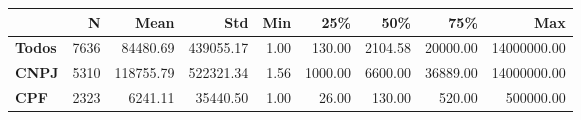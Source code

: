 \begin{tabular}{lrrrrrrrr}
\toprule
{} &    N &      Mean &       Std &  Min &     25\% &     50\% &      75\% &         Max \\
\midrule
\textbf{Todos} & 7636 &  84480.69 & 439055.17 & 1.00 &  130.00 & 2104.58 & 20000.00 & 14000000.00 \\
\textbf{CNPJ } & 5310 & 118755.79 & 522321.34 & 1.56 & 1000.00 & 6600.00 & 36889.00 & 14000000.00 \\
\textbf{CPF  } & 2323 &   6241.11 &  35440.50 & 1.00 &   26.00 &  130.00 &   520.00 &   500000.00 \\
\bottomrule
\end{tabular}
